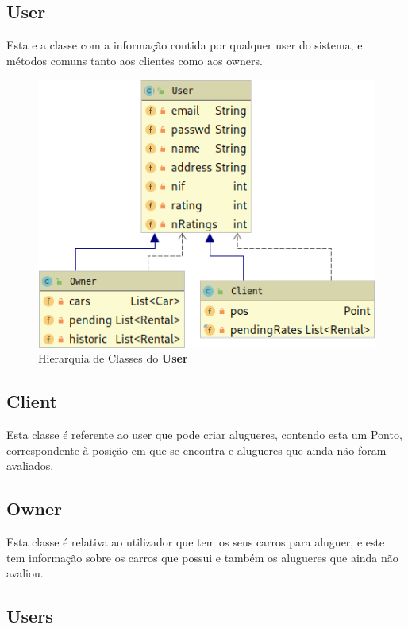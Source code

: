 \documentclass[a4paper]{report}
\begin{document}
\subsection{User}

Esta e a classe com a informação contida por qualquer user do sistema,
e métodos comuns tanto aos clientes como aos owners.

\begin{figure}[h]
    \centering
    \includegraphics[scale=0.5]{hierarquiaUser.png}
    \caption{Hierarquia de Classes do \textbf{User}}
\end{figure}

\subsection{Client}

Esta classe é referente ao user que pode criar alugueres, contendo
esta um Ponto, correspondente à posição em que se encontra e alugueres
que ainda não foram avaliados.

\subsection{Owner}

Esta classe é relativa ao utilizador que tem os seus carros para aluguer,
e este tem informação sobre os carros que possui e também os alugueres
que ainda não avaliou.

\subsection{Users}
\end{document}
